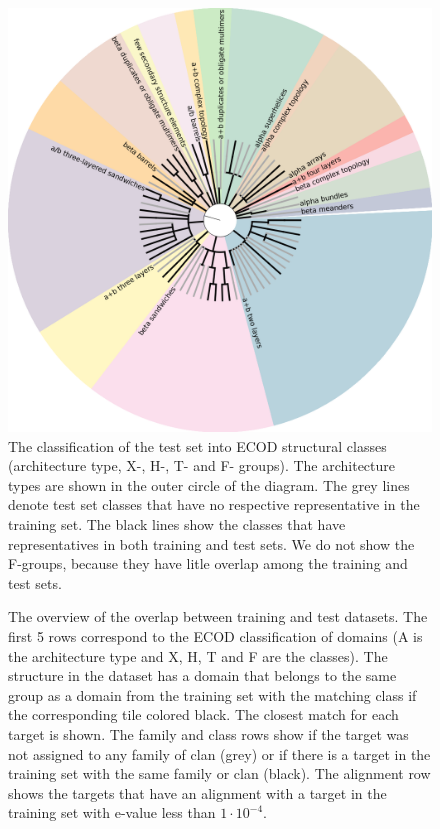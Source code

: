 \begin{figure}[H]
    \centering
    \includegraphics[width=\linewidth]{Fig/folds_graph.png}
    \caption{The classification of the test set into ECOD structural classes (architecture type, X-, H-, T- and F- groups). The architecture 
    types are shown in the outer circle of the diagram. The grey lines denote test set classes that have no respective representative in the 
    training set. The black lines show the classes that have representatives in both training and test sets. We do not show the F-groups, because
    they have litle overlap among the training and test sets.}
    \label{Fig:foldsGraph}
\end{figure}

\begin{figure}[H]
    \caption{The overview of the overlap between training and test datasets. The first 5 rows correspond to the ECOD classification of 
    domains (A is the architecture type and X, H, T and F are the classes). The structure in the dataset has
    a domain that belongs to the same group as a domain from the training set with the matching class if the corresponding tile colored black.
    The closest match for each target is shown. The family and class rows show if the target was not assigned to any family of clan (grey) or 
    if there is a target in the training set with the same family or clan (black). The alignment row shows the targets that have an alignment
    with a target in the training set with e-value less than $1\cdot10^{-4}$.}
    \label{Fig:summaryTable}
\end{figure}